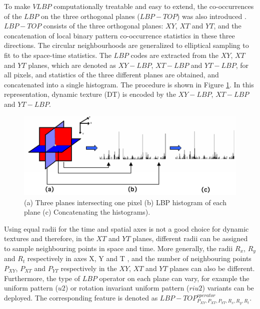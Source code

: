To make $VLBP$ computationally treatable and easy to extend, the co-occurrences of the $LBP$ on the three orthogonal planes ($LBP-TOP$) was also introduced \cite{zhao2007dynamic}. $LBP-TOP$ consists of the three orthogonal planes: $XY$, $XT$ and $YT$, and the concatenation of local binary pattern co-occurrence statistics in these three directions. The circular neighbourhoods are generalized to elliptical sampling to fit to the space-time statistics. The $LBP$ codes are extracted from the $XY$, $XT$ and $YT$ planes, which are denoted as $XY-LBP$, $XT-LBP$ and $YT-LBP$, for all pixels, and statistics of the three different planes are obtained, and concatenated into a single histogram. The procedure is shown in Figure \ref{fig:LBP-TOP_design}. In this representation, dynamic texture (DT) is encoded by the  $XY-LBP$, $XT-LBP$ and $YT-LBP$.

\begin{figure}[!htb]
\begin{center}
\includegraphics [width=0.75\linewidth] {images/proposed_countermeasure/LBP-TOP_design.png}
\caption{(a) Three planes intersecting one pixel (b) LBP histogram of each plane (c) Concatenating the histograms).} \label{fig:LBP-TOP_design}
\end{center}
\end{figure}

Using equal radii for the time and spatial axes is not a good choice for dynamic textures \cite{zhao2007dynamic} and therefore, in the $XT$ and $YT$ planes, different radii can be assigned to sample neighbouring points in space and time. More generally, the radii $R_{x}$, $R_{y}$  and $R_{t}$ respectively in axes X, Y and T , and the number of neighbouring points $P_{XY}$, $P_{XT}$ and $P_{YT}$ respectively in the $XY$, $XT$ and $YT$ planes can also be different. Furthermore, the type of $LBP$ operator on each plane can vary, for example the uniform pattern ($u2$) or rotation invariant uniform pattern ($riu2$) variants \cite{pietikainen2011computer} can be deployed. The corresponding feature is denoted as $LBP-TOP_{P_{XY},P_{XT},P_{YT},R_{x},R_{y},R_{t}}^{operator}$.

